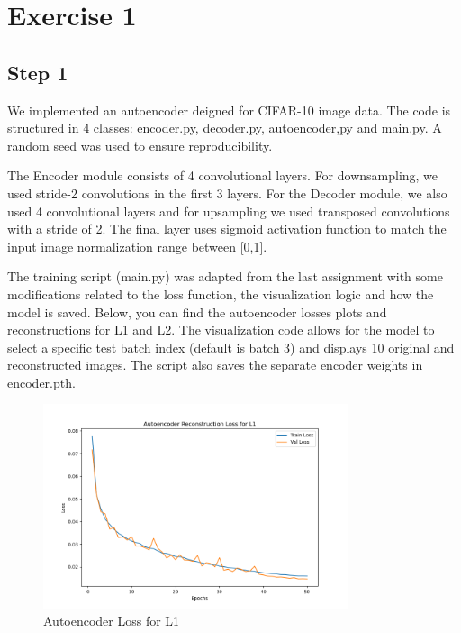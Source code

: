 

\section{Exercise 1}
\subsection{Step 1}

We implemented an autoencoder deigned for CIFAR-10 image data. The code is structured in 4 classes: encoder.py, decoder.py, autoencoder,py and main.py. A random seed was used to ensure reproducibility.

The Encoder module consists of 4 convolutional layers. For downsampling, we used stride-2 convolutions in the first 3 layers. For the Decoder module, we also used 4 convolutional layers and for upsampling we used transposed convolutions with a stride of 2. The final layer uses sigmoid activation function to match the input image normalization range between [0,1].

The training script (main.py) was adapted from the last assignment with some modifications related to the loss function, the visualization logic and how the model is saved. Below, you can find the autoencoder losses plots and reconstructions for L1 and L2. The visualization code allows for the model to select a specific test batch index (default is batch 3) and displays 10 original and reconstructed images. The script also saves the separate encoder weights in encoder.pth.

\begin{figure}[H] 
    \centering
    \includegraphics[width=0.8\textwidth]{assignment_2/report/images/ex1_autoencoder_loss_l1.png} 
    \caption{Autoencoder Loss for L1}
\end{figure}

